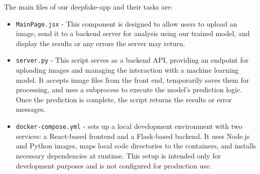 \documentclass[conference]{IEEEtran}
\begin{document}
The main files of our deepfake-app and their tasks are:

\begin{itemize}
    \item \texttt{MainPage.jsx} - This component is designed to allow users to upload an image, send it to a backend server for analysis using our trained model, and display the results or any errors the server may return.
    \item \texttt{server.py} - This script serves as a backend API, providing an endpoint for uploading images and managing the interaction with a machine learning model. It accepts image files from the front end, temporarily saves them for processing, and uses a subprocess to execute the model's prediction logic. Once the prediction is complete, the script returns the results or error messages.
    \item \texttt{docker-compose.yml} - sets up a local development environment with two services: a React-based frontend and a Flask-based backend. It uses Node.js and Python images, maps local code directories to the containers, and installs necessary dependencies at runtime. This setup is intended only for development purposes and is not configured for production use.
\end{itemize}
\end{document}
